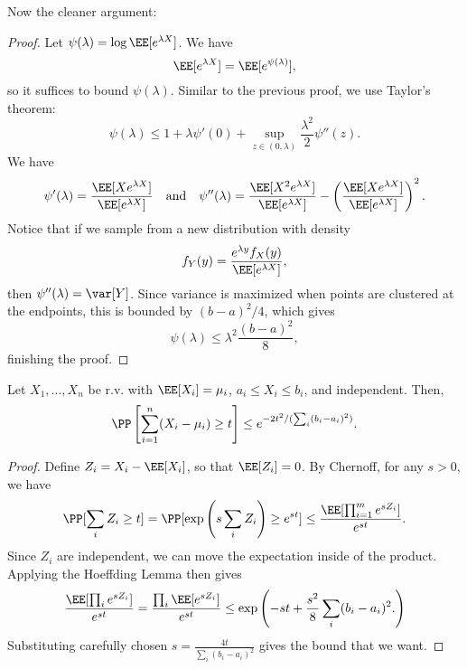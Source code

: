 \noindent Now the cleaner argument: 
\begin{proof}
Let $\psi(\lambda) = \log \EE[e^{\lambda X}]$. We have 
\[\EE[e^{\lambda X}] = \EE[e^{\psi(\lambda)}],\]
so it suffices to bound $\psi(\lambda)$. Similar to the previous proof, we use Taylor's theorem: 
\[\psi(\lambda) \leq 1 + \lambda \psi'(0) + \sup_{z\in (0,\lambda)}\frac{\lambda^2}{2}\psi''(z).\]
We have 
\[\psi'(\lambda) = \frac{\EE[Xe^{\lambda X}]}{\EE[e^{\lambda X}]}\quad\text{and}\quad \psi''(\lambda) = \frac{\EE[X^2e^{\lambda X}]}{\EE[e^{\lambda X}]} - \left(\frac{\EE[Xe^{\lambda X}]}{\EE[e^{\lambda X}]}\right)^2.\] 
Notice that if we sample from a new distribution with density 
\[f_{Y}(y) = \frac{e^{\lambda y}f_X(y)}{\EE[e^{\lambda X}]},\] 
then $\psi''(\lambda) = \var[Y]$. Since variance is maximized when points are clustered at the endpoints, this is bounded by $(b-a)^2/4$, which gives
\[\psi(\lambda)\leq \lambda^2\frac{(b-a)^2}{8},\] 
finishing the proof.
\end{proof}

\begin{theorem}

Let $X_1,\hdots,X_n$ be r.v. with $\EE[X_i]=\mu_i$, $a_i\leq X_i\leq b_i$, and independent. Then, 
\[\PP\left[\sum_{i=1}^n(X_i-\mu_i)\geq t\right]\leq e^{-2t^2/(\sum_i (b_i-a_i)^2)}.\] 
\end{theorem}

\begin{proof}
	Define $Z_i = X_i-\EE[X_i]$, so that $\EE[Z_i] = 0$. By Chernoff, for any $s>0$, we have 
	\[\PP[\sum_i Z_i\geq t] = \PP[\exp\left(s\sum_i Z_i\right)\geq e^{st}] \leq \frac{\EE[\prod_{i=1}^m e^{sZ_i}]}{e^{st}}.\] 
	Since $Z_i$ are independent, we can move the expectation inside of the product. Applying the Hoeffding Lemma then gives
	\[\frac{\EE[\prod_i e^{sZ_i}]}{e^{st}} = \frac{\prod_i \EE[e^{sZ_i}]}{e^{st}}\leq \exp\left(-st + \frac{s^2}{8}\sum_i (b_i-a_i)^2.\right)\] 
	Substituting carefully chosen $s = \frac{4t}{\sum_i (b_i-a_i)^2}$ gives the bound that we want.
\end{proof}

